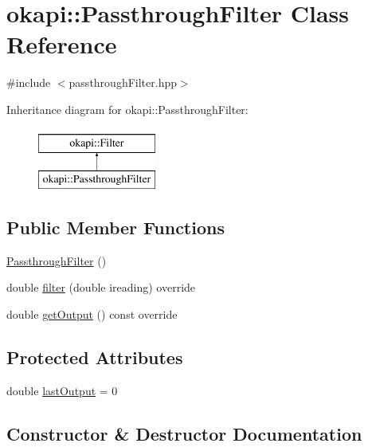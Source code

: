 \hypertarget{classokapi_1_1PassthroughFilter}{}\section{okapi\+::Passthrough\+Filter Class Reference}
\label{classokapi_1_1PassthroughFilter}


{\ttfamily \#include $<$passthrough\+Filter.\+hpp$>$}

Inheritance diagram for okapi\+::Passthrough\+Filter\+:\begin{figure}[H]
\begin{center}
\leavevmode
\includegraphics[height=2.000000cm]{classokapi_1_1PassthroughFilter}
\end{center}
\end{figure}
\subsection*{Public Member Functions}
\begin{DoxyCompactItemize}
\item 
\mbox{\hyperlink{classokapi_1_1PassthroughFilter_aaf9d47b7b5e9de08271f8c12c46b4f44}{Passthrough\+Filter}} ()
\item 
double \mbox{\hyperlink{classokapi_1_1PassthroughFilter_a359570b00c564dde65e02c6485079544}{filter}} (double ireading) override
\item 
double \mbox{\hyperlink{classokapi_1_1PassthroughFilter_a90bd8c34fa22bfc7c6f9f76fd6e655dc}{get\+Output}} () const override
\end{DoxyCompactItemize}
\subsection*{Protected Attributes}
\begin{DoxyCompactItemize}
\item 
double \mbox{\hyperlink{classokapi_1_1PassthroughFilter_af343f68dc96aad3f4342909047331bc4}{last\+Output}} = 0
\end{DoxyCompactItemize}


\subsection{Constructor \& Destructor Documentation}
\mbox{\label{classokapi_1_1PassthroughFilter_aaf9d47b7b5e9de08271f8c12c46b4f44}} 
